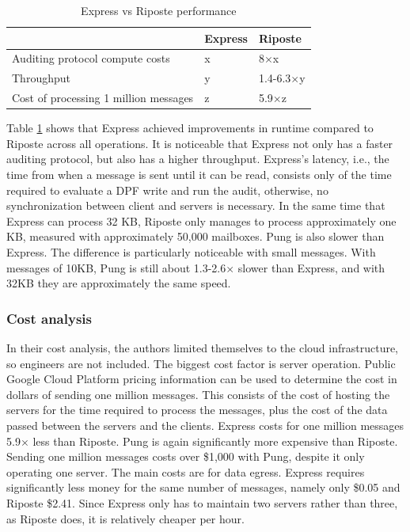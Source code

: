 \documentclass[a4paper]{article}
\begin{document}
\begin{table}[h!]
\centering
\caption{Express vs Riposte performance}
\label{tab:riposte}
\begin{tabular}{lll}
\hline
                           & Express & Riposte   \\ \hline
Auditing protocol compute costs          & x       & 8$\times$x       \\ \hline
Throughput                 & y       & 1.4-6.3$\times$y \\ \hline
Cost of processing 1 million messages & z       & 5.9$\times$z     \\ \hline
\end{tabular}
\end{table}
Table \ref{tab:riposte} shows that Express achieved improvements in runtime compared to Riposte across all operations. It is noticeable that Express not only has a faster auditing protocol, but also has a higher throughput. 
Express's latency, i.e., the time from when a message is sent until it can be read, consists only of the time required to evaluate a DPF write and run the audit, otherwise, no synchronization between client and servers is necessary. In the same time that Express can process 32 KB, Riposte only manages to process approximately one KB, measured with approximately 50,000 mailboxes. Pung is also slower than Express. The difference is particularly noticeable with small messages. With messages of 10KB, Pung is still about 1.3-2.6$\times$ slower than Express, and with 32KB they are approximately the same speed. 
\subsubsection{Cost analysis} In their cost analysis, the authors limited themselves to the cloud infrastructure, so engineers are not included. The biggest cost factor is server operation. Public Google Cloud Platform pricing information can be used to determine the cost in dollars of sending one million messages. This consists of the cost of hosting the servers for the time required to process the messages, plus the cost of the data passed between the servers and the clients. Express costs for one million messages 5.9$\times$ less than Riposte. Pung is again significantly more expensive than Riposte. Sending one million messages costs over \$1,000 with Pung, despite it only operating one server. The main costs are for data egress. Express requires significantly less money for the same number of messages, namely only \$0.05 and Riposte \$2.41.  Since Express only has to maintain two servers rather than three, as Riposte does, it is relatively cheaper per hour.
\end{document}
